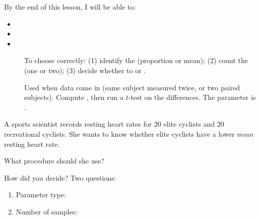 \documentclass[10pt]{article}
\begin{document}
\namedateperiod

\vspace{0.12in}

\begin{objectivebox}
By the end of this lesson, I will be able to:
\begin{itemize}
  \item {}
  \item {}
  \item {}
\end{itemize}
\end{objectivebox}

\begin{vocabbox}
\begin{description}
  \item[]
        To choose correctly: (1) identify the  (proportion or mean); (2) count
        the  (one or two); (3) decide whether to  or .
  \item[]
        Used when data come in  (same subject measured twice, or two paired
        subjects). Compute , then run a  $t$-test on the differences.
        The parameter is .
\end{description}
\end{vocabbox}

\begin{hookbox}
A sports scientist records resting heart rates for 20 elite cyclists and 20 recreational
cyclists. She wants to know whether elite cyclists have a lower \emph{mean} resting heart rate.

What procedure should she use? 

How did you decide? Two questions:
\begin{enumerate}
  \item Parameter type: 
  \item Number of samples: 
\end{enumerate}
\end{hookbox}
\end{document}
